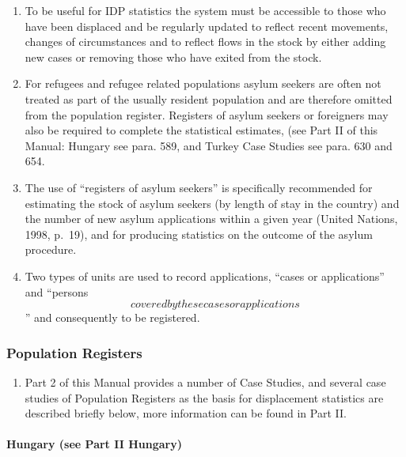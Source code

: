 \documentclass[
]{article}
\providecommand{\tightlist}{%
  \setlength{\itemsep}{0pt}\setlength{\parskip}{0pt}}
\begin{document}
\begin{enumerate}
\def\labelenumi{\arabic{enumi}.}
\setcounter{enumi}{153}
\item
  To be useful for IDP statistics the system must be accessible to
  those who have been displaced and be regularly updated to reflect
  recent movements, changes of circumstances and to reflect flows in
  the stock by either adding new cases or removing those who have
  exited from the stock.
\item
  For refugees and refugee related populations asylum seekers are
  often not treated as part of the usually resident population and are
  therefore omitted from the population register. Registers of asylum
  seekers or foreigners may also be required to complete the
  statistical estimates, (see Part II of this Manual: Hungary see
  para. 589, and Turkey Case Studies see para. 630 and 654.
\item
  The use of ``registers of asylum seekers'' is specifically
  recommended for estimating the stock of asylum seekers (by length of
  stay in the country) and the number of new asylum applications
  within a given year (United Nations, 1998, p.~19), and for producing
  statistics on the outcome of the asylum procedure.
\item
  Two types of units are used to record applications, ``cases or
  applications'' and ``persons \[covered by these cases or
      applications\]'' and consequently to be registered.
\end{enumerate}

\hypertarget{c.1.-population-registers}{%
\subsubsection{Population Registers}\label{c.1.-population-registers}}

\begin{enumerate}
\def\labelenumi{\arabic{enumi}.}
\setcounter{enumi}{157}
\tightlist
\item
  Part 2 of this Manual provides a number of Case Studies, and
  several case studies of Population Registers as the basis for
  displacement statistics are described briefly below, more
  information can be found in Part II.
\end{enumerate}

\hypertarget{hungary-see-part-ii-hungary}{%
\paragraph{Hungary (see Part II Hungary)}\label{hungary-see-part-ii-hungary}}
\end{document}
